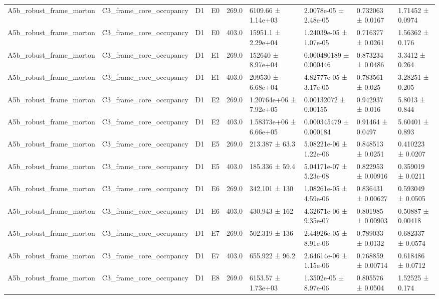 \begin{table}
\begin{tabular}{lllllllll}
A5b\_robust\_frame\_morton & C3\_frame\_core\_occupancy & D1 & E0 & 269.0 & 6109.66 ± 1.14e+03 & 2.0078e-05 ± 2.48e-05 & 0.732063 ± 0.0167 & 1.71452 ± 0.0974 \\
A5b\_robust\_frame\_morton & C3\_frame\_core\_occupancy & D1 & E0 & 403.0 & 15951.1 ± 2.29e+04 & 1.24039e-05 ± 1.07e-05 & 0.716377 ± 0.0261 & 1.56362 ± 0.176 \\
A5b\_robust\_frame\_morton & C3\_frame\_core\_occupancy & D1 & E1 & 269.0 & 152640 ± 8.97e+04 & 0.000480189 ± 0.000446 & 0.873234 ± 0.0486 & 3.3412 ± 0.264 \\
A5b\_robust\_frame\_morton & C3\_frame\_core\_occupancy & D1 & E1 & 403.0 & 209530 ± 6.68e+04 & 4.82777e-05 ± 3.17e-05 & 0.783561 ± 0.025 & 3.28251 ± 0.205 \\
A5b\_robust\_frame\_morton & C3\_frame\_core\_occupancy & D1 & E2 & 269.0 & 1.20764e+06 ± 7.92e+05 & 0.00132072 ± 0.00155 & 0.942937 ± 0.016 & 5.8013 ± 0.844 \\
A5b\_robust\_frame\_morton & C3\_frame\_core\_occupancy & D1 & E2 & 403.0 & 1.58373e+06 ± 6.66e+05 & 0.000345479 ± 0.000184 & 0.91464 ± 0.0497 & 5.60401 ± 0.893 \\
A5b\_robust\_frame\_morton & C3\_frame\_core\_occupancy & D1 & E5 & 269.0 & 213.387 ± 63.3 & 5.08221e-06 ± 1.22e-06 & 0.848513 ± 0.0251 & 0.410223 ± 0.0207 \\
A5b\_robust\_frame\_morton & C3\_frame\_core\_occupancy & D1 & E5 & 403.0 & 185.336 ± 59.4 & 5.04171e-07 ± 5.23e-08 & 0.822953 ± 0.00916 & 0.359019 ± 0.0211 \\
A5b\_robust\_frame\_morton & C3\_frame\_core\_occupancy & D1 & E6 & 269.0 & 342.101 ± 130 & 1.08261e-05 ± 4.59e-06 & 0.836431 ± 0.00627 & 0.593049 ± 0.0505 \\
A5b\_robust\_frame\_morton & C3\_frame\_core\_occupancy & D1 & E6 & 403.0 & 430.943 ± 162 & 4.32671e-06 ± 9.35e-07 & 0.801985 ± 0.00903 & 0.50887 ± 0.00418 \\
A5b\_robust\_frame\_morton & C3\_frame\_core\_occupancy & D1 & E7 & 269.0 & 502.319 ± 136 & 2.44926e-05 ± 8.91e-06 & 0.789033 ± 0.0132 & 0.682337 ± 0.0574 \\
A5b\_robust\_frame\_morton & C3\_frame\_core\_occupancy & D1 & E7 & 403.0 & 655.922 ± 96.2 & 2.64614e-06 ± 1.15e-06 & 0.768859 ± 0.00714 & 0.618486 ± 0.0712 \\
A5b\_robust\_frame\_morton & C3\_frame\_core\_occupancy & D1 & E8 & 269.0 & 6153.57 ± 1.73e+03 & 1.3502e-05 ± 8.97e-06 & 0.805576 ± 0.0504 & 1.52525 ± 0.174 \\

\end{tabular}
\end{table}
